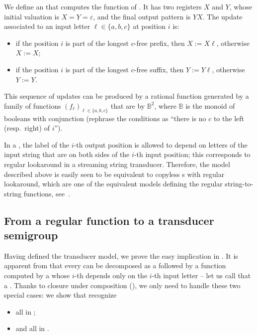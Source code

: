 \begin{example}
  We define an \sst{} that computes the function of . It has two registers $X$ and $Y$, whose initial valuation is $X=Y=\varepsilon$, and the final output pattern is $YX$. The update associated to an input letter $\ell\in\{a,b,c\}$ at position $i$ is:
  \begin{itemize}
    \item if the position $i$ is part of the longest $c$-free prefix, then $X := X\ell$, otherwise $X:=X$;
    \item if the position $i$ is part of the longest $c$-free suffix, then $Y := Y\ell$, otherwise $Y:=Y$.
  \end{itemize}
  This sequence of updates can be produced by a rational function generated by a family of functions $(f_\ell)_{\ell\in\{a,b,c\}}$ that are  by $\mathbb{B}^2$, where $\mathbb{B}$ is the monoid of booleans with conjunction (rephrase the conditions as \enquote{there is no $c$ to the left (resp.~right) of $i$}).
\end{example}

In a , the label of the $i$-th output position is allowed to depend on letters of the input string that are on both sides of the $i$-th input position; this corresponds to regular lookaround in a streaming string transducer. Therefore, the model described above is easily seen to be equivalent to copyless \sst{}s with regular lookaround, which are one of the equivalent models defining the regular string-to-string functions, see~\cite[Section~IV.C]{AlurFT12}.

\subsection{From a regular function to a transducer semigroup}
\label{sec:easy}

\AP Having defined the transducer model, we prove the easy implication in
. It is apparent from  that every
 can be decomposed as a  followed by a function
computed by a  whose $i$-th  depends
only on the $i$-th input letter -- let us call that a  \sst. Thanks
to closure under composition (), we only need to handle
these two special cases: we show that   recognize
\begin{itemize}
\item all  in ;
\item and all   in .
\end{itemize}

